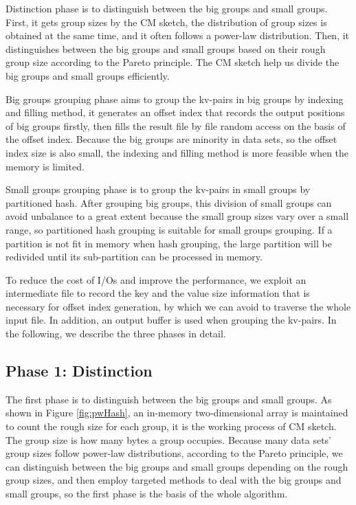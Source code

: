 Distinction phase is to distinguish between the big groups and small groups. First, it gets group sizes by the CM sketch, the distribution of group sizes is obtained at the same time, and it often follows a power-law distribution. Then, it distinguishes between the big groups and small groups based on their rough group size according to the Pareto principle. The CM sketch help us divide the big groups and small groups efficiently.

Big groups grouping phase aims to group the kv-pairs in big groups by indexing and filling method, it generates an offset index that records the output positions of big groups firstly, then fills the result file by file random access on the basis of the offset index. Because the big groups are minority in data sets, so the offset index size is also small, the indexing and filling method is more feasible when the memory is limited. 

Small groups grouping phase is to group the kv-pairs in small groups by partitioned hash. After grouping big groups, this division of small groups can avoid unbalance to a great extent because the small group sizes vary over a small range, so partitioned hash grouping is suitable for small groups grouping. If a partition is not fit in memory when hash grouping, the large partition will be redivided until its sub-partition can be processed in memory.

To reduce the cost of I/Os and improve the performance, we exploit an intermediate file to record the key and the value size information that is necessary for offset index generation, by which we can avoid to traverse the whole input file. In addition, an output buffer is used when grouping the kv-pairs. In the following, we describe the three phases in detail.

\subsection{Phase 1: Distinction}%

The first phase is to distinguish between the big groups and small groups. As shown in Figure \ref{fig:pwHash}, an in-memory two-dimensional array is maintained to count the rough size for each group, it is the working process of CM sketch. The group size is how many bytes a group occupies. Because many data sets' group sizes follow power-law distributions, according to the Pareto principle, we can distinguish between the big groups and small groups depending on the rough group sizes, and then employ targeted methods to deal with the big groups and small groups, so the first phase is the basis of the whole algorithm. 

